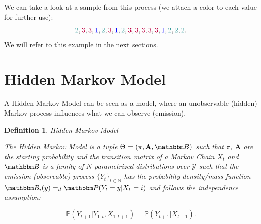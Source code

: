 \documentclass[shortabstract]{iithesis}
\newtheorem{definition}{Definition}
\begin{document}
We can take a look at a sample from this process (we attach a color to each value for further use):
\begin{equation} \label{eq:example_mc}
    \textcolor{teal}{2}, \textcolor{purple}{3}, \textcolor{purple}{3}, \textcolor{blue}{1}, \textcolor{teal}{2}, \textcolor{purple}{3}, \textcolor{blue}{1}, \textcolor{teal}{2}, \textcolor{purple}{3}, \textcolor{purple}{3}, \textcolor{purple}{3}, \textcolor{purple}{3}, \textcolor{purple}{3}, \textcolor{blue}{1}, \textcolor{teal}{2}, \textcolor{teal}{2}, \textcolor{teal}{2}\text{.}
\end{equation}
\linebreak
We will refer to this example in the next sections.

\section{Hidden Markov Model}  \label{sec:HMM}

A Hidden Markov Model can be seen as a model, where an unobservable (hidden) Markov process influences what we can observe (emission). 


\begin{definition}{Hidden Markov Model} \label{def:hmm}
    
    The Hidden Markov Model is a tuple $\Theta =  (\pi, \textbf{A}, \mathbbm B)$ such that $\pi$, $\textbf{A}$ are the starting probability and the transition matrix of a Markov Chain $X_t$ and $\mathbbm B$ is a family of $N$  parametrized distributions over $\mathcal Y$ such that the emission (observable) process $\{Y_t\}_{t \in \mathbb N}$ has the probability density/mass function $\mathbbm B_i(y) =_d \mathbbm P (Y_t = y | X_t = i)$ and follows the independence assumption:

    \begin{equation*}
        \mathbb P (Y_{t+1} | Y_{1:t}, X_{1:t+1} ) = \mathbb P (Y_{t+1} | X_{t+1})\text{.}
    \end{equation*}
\end{definition}
\end{document}

